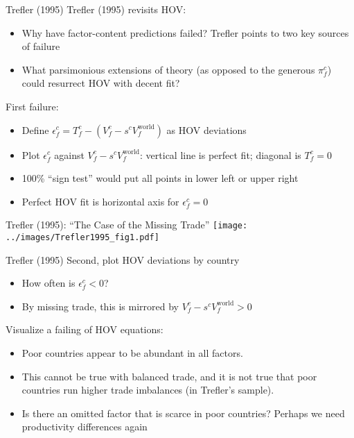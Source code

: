 \documentclass[10pt,notes=hide]{beamer}
\begin{document}
\begin{frame}{Trefler (1995)}
Trefler (1995) revisits HOV:
\begin{itemize}
	\item Why have factor-content predictions failed? Trefler points to two key sources of failure
	\item What parsimonious extensions of theory (as opposed to the generous $\pi_f^c$) could resurrect HOV with decent fit?
\end{itemize}
First failure:
\begin{itemize}
	\item Define $\epsilon_f^c = T_f^c - (V_f^c - s^c V_f^{\text{world}})$ as HOV deviations
	\item Plot $\epsilon_f^c$ against $V_f^c - s^c V_f^{\text{world}}$: vertical line is perfect fit; diagonal is $T_f^c=0$
	\item 100\% ``sign test'' would put all points in lower left or upper right
	\item Perfect HOV fit is horizontal axis for $\epsilon_f^c=0$
\end{itemize}
\end{frame}
\begin{frame}{Trefler (1995): ``The Case of the Missing Trade''}
\texttt{[image: ../images/Trefler1995\_fig1.pdf]}
\end{frame}
\begin{frame}{Trefler (1995)}
Second, plot HOV deviations by country
\begin{itemize}
	\item How often is $\epsilon_f^c<0$?
	\item By missing trade, this is mirrored by $V_f^c - s^c V_f^{\text{world}} >0$
\end{itemize}
Visualize a failing of HOV equations:
\begin{itemize}
	\item Poor countries appear to be abundant in all factors.
	\item This cannot be true with balanced trade, and it is not true that poor countries run higher trade imbalances (in Trefler’s sample).
	\item Is there an omitted factor that is scarce in poor countries? Perhaps we need productivity differences again
\end{itemize}
\end{frame}
\end{document}
